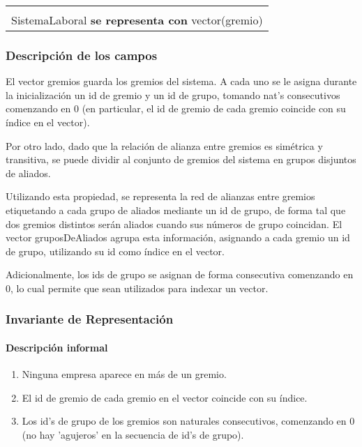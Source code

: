 \begin{center}
\begin{tabular}{|l|} 
\hline
\\
SistemaLaboral \textbf{se representa con} vector(gremio) \\
\hline
\end{tabular}
\end{center}

\subsubsection{Descripci\'on de los campos}

	El vector gremios guarda los gremios del sistema. A cada uno se le asigna durante la inicializaci\'on un id de gremio y un id de grupo, tomando nat's consecutivos comenzando en 0 (en particular, el id de gremio de cada gremio coincide con su \'indice en el vector).

	Por otro lado, dado que la relaci\'on de alianza entre gremios es sim\'etrica y transitiva, se puede dividir al conjunto de gremios del sistema en grupos disjuntos de aliados.

	Utilizando esta propiedad, se representa la red de alianzas entre gremios etiquetando a cada grupo de aliados mediante un id de grupo, de forma tal que dos gremios distintos ser\'an aliados cuando sus n\'umeros de grupo coincidan. El vector gruposDeAliados agrupa esta informaci\'on, asignando a cada gremio un id de grupo, utilizando su id como \'indice en el vector. 

	Adicionalmente, los ids de grupo se asignan de forma consecutiva comenzando en 0, lo cual permite que sean utilizados para indexar un vector.

\subsubsection{Invariante de Representaci\'on}

\paragraph{Descripci\'on informal}

\begin{enumerate}
	\item Ninguna empresa aparece en m\'as de un gremio.
	\item El id de gremio de cada gremio en el vector coincide con su \'indice.
	\item Los id's de grupo de los gremios son naturales consecutivos, comenzando en 0 (no hay 'agujeros' en la secuencia de id's de grupo).
\end{enumerate}

